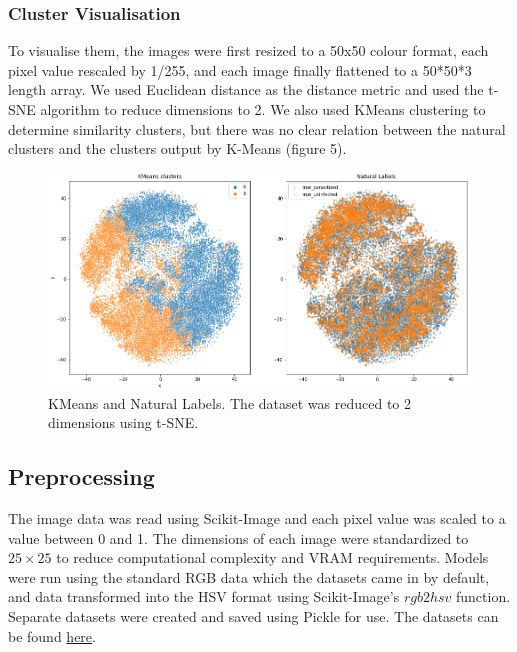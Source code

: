 \documentclass[10pt,twocolumn,letterpaper]{article}
\begin{document}
\subsubsection{Cluster Visualisation}
To visualise them, the images were first resized to a 50x50 colour format, each pixel value rescaled by 1/255, and each image finally flattened to a 50*50*3 length array. We used Euclidean distance as the distance metric and used the t-SNE algorithm to reduce dimensions to 2. We also used KMeans clustering to determine similarity clusters, but there was no clear relation between the natural clusters and the clusters output by K-Means (figure 5).

\begin{figure}[t]
   \begin{center}
      \includegraphics[width=1\linewidth]{../Plots/kmeans_natural labels.png}
   \end{center}
      \caption{KMeans and Natural Labels. The dataset was reduced to 2 dimensions using t-SNE.}
   \label{fig:tsne_vis}
\end{figure}

\subsection{Preprocessing}
The image data was read using Scikit-Image and each pixel value was scaled to a value between 0 and 1. The dimensions of each image were standardized to $25 \times 25$ to reduce computational complexity and VRAM requirements. Models were run using the standard RGB data which the datasets came in by default, and data transformed into the HSV format using Scikit-Image's $rgb2hsv$ function. Separate datasets were created and saved using Pickle for use. The datasets can be found \href{https://drive.google.com/drive/folders/1rKEHtQ_Sr2vU01yj_xC_ODwUp8QesxWY?usp=share_link}{here}.
\end{document}
